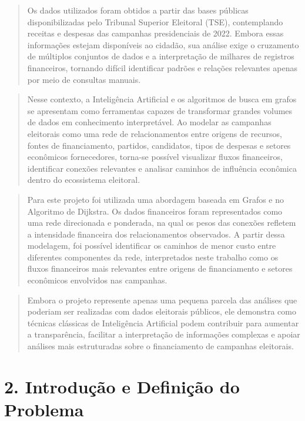 \documentclass[11pt]{article}
\begin{document}
\begin{quote}
Os dados utilizados foram obtidos a partir das bases públicas
disponibilizadas pelo Tribunal Superior Eleitoral (TSE), contemplando
receitas e despesas das campanhas presidenciais de 2022. Embora essas
informações estejam disponíveis ao cidadão, sua análise exige o
cruzamento de múltiplos conjuntos de dados e a interpretação de milhares
de registros financeiros, tornando difícil identificar padrões e
relações relevantes apenas por meio de consultas manuais.
\end{quote}

\begin{quote}
Nesse contexto, a Inteligência Artificial e os algoritmos de busca em
grafos se apresentam como ferramentas capazes de transformar grandes
volumes de dados em conhecimento interpretável. Ao modelar as campanhas
eleitorais como uma rede de relacionamentos entre origens de recursos,
fontes de financiamento, partidos, candidatos, tipos de despesas e
setores econômicos fornecedores, torna-se possível visualizar fluxos
financeiros, identificar conexões relevantes e analisar caminhos de
influência econômica dentro do ecossistema eleitoral.
\end{quote}

\begin{quote}
Para este projeto foi utilizada uma abordagem baseada em Grafos e no
Algoritmo de Dijkstra. Os dados financeiros foram representados como uma
rede direcionada e ponderada, na qual os pesos das conexões refletem a
intensidade financeira dos relacionamentos observados. A partir dessa
modelagem, foi possível identificar os caminhos de menor custo entre
diferentes componentes da rede, interpretados neste trabalho como os
fluxos financeiros mais relevantes entre origens de financiamento e
setores econômicos envolvidos nas campanhas.
\end{quote}

\begin{quote}
Embora o projeto represente apenas uma pequena parcela das análises que
poderiam ser realizadas com dados eleitorais públicos, ele demonstra
como técnicas clássicas de Inteligência Artificial podem contribuir para
aumentar a transparência, facilitar a interpretação de informações
complexas e apoiar análises mais estruturadas sobre o financiamento de
campanhas eleitorais.
\end{quote}

    \section{2. Introdução e Definição do
Problema}\label{introduuxe7uxe3o-e-definiuxe7uxe3o-do-problema}
\end{document}
